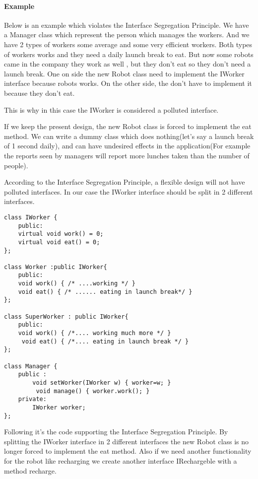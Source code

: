 \documentclass{book}
\begin{document}
\paragraph{Example}

Below is an example which violates the Interface Segregation Principle. We have a Manager class which represent the person which manages the workers.
And we have 2 types of workers some average and some very efficient workers. Both types of workers works and they need a daily launch break to eat.
But now some robots came in the company they work as well , but they don't eat so they don't need a launch break.
One on side the new Robot class need to implement the IWorker interface because robots works.
On the other side, the don't have to implement it because they don't eat.

This is why in this case the IWorker is considered a polluted interface.

If we keep the present design, the new Robot class is forced to implement the eat method.
We can write a dummy class which does nothing(let's say a launch break of 1 second daily),
and can have undesired effects in the application(For example the reports seen by managers will report more lunches taken than the number of people).

According to the Interface Segregation Principle, a flexible design will not have polluted interfaces. In our case the IWorker interface should be split in 2 different interfaces.

\begin{lstlisting}[caption={interface segregation principle - bad example}]
class IWorker {
    public:
    virtual void work() = 0;
	virtual void eat() = 0;
};

class Worker :public IWorker{
    public:
    void work() { /* ....working */ }
	void eat() { /* ...... eating in launch break*/ }
};

class SuperWorker : public IWorker{
    public:
    void work() { /*.... working much more */ }
	 void eat() { /*.... eating in launch break */ }
};

class Manager {
    public :
        void setWorker(IWorker w) { worker=w; }
    	 void manage() { worker.work(); }
    private:
    	IWorker worker;
};
\end{lstlisting}
Following it's the code supporting the Interface Segregation Principle.
By splitting the IWorker interface in 2 different interfaces the new Robot class is no longer forced to implement the eat method.
Also if we need another functionality for the robot like recharging we create another interface IRechargeble with a method recharge.
\end{document}
